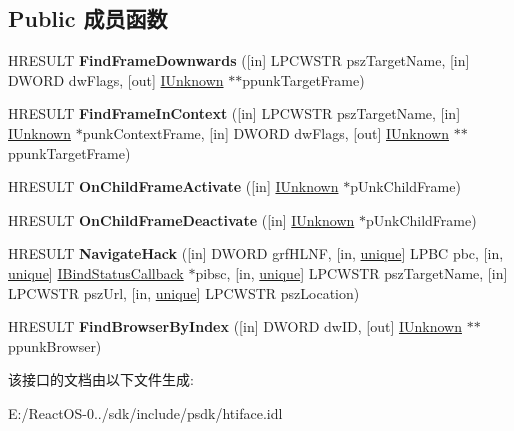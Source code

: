 \subsection*{Public 成员函数}
\begin{DoxyCompactItemize}
\item 
\mbox{\label{interface_i_target_frame_priv_a41ffeee3aa5cc4c9626868f0cfce2072}} 
H\+R\+E\+S\+U\+LT {\bfseries Find\+Frame\+Downwards} (\mbox{[}in\mbox{]} L\+P\+C\+W\+S\+TR psz\+Target\+Name, \mbox{[}in\mbox{]} D\+W\+O\+RD dw\+Flags, \mbox{[}out\mbox{]} \hyperlink{interface_i_unknown}{I\+Unknown} $\ast$$\ast$ppunk\+Target\+Frame)
\item 
\mbox{\label{interface_i_target_frame_priv_a149d03d477deeeffb41709668bf6246a}} 
H\+R\+E\+S\+U\+LT {\bfseries Find\+Frame\+In\+Context} (\mbox{[}in\mbox{]} L\+P\+C\+W\+S\+TR psz\+Target\+Name, \mbox{[}in\mbox{]} \hyperlink{interface_i_unknown}{I\+Unknown} $\ast$punk\+Context\+Frame, \mbox{[}in\mbox{]} D\+W\+O\+RD dw\+Flags, \mbox{[}out\mbox{]} \hyperlink{interface_i_unknown}{I\+Unknown} $\ast$$\ast$ppunk\+Target\+Frame)
\item 
\mbox{\label{interface_i_target_frame_priv_af96f999a3af04a8000cb3357f017fe14}} 
H\+R\+E\+S\+U\+LT {\bfseries On\+Child\+Frame\+Activate} (\mbox{[}in\mbox{]} \hyperlink{interface_i_unknown}{I\+Unknown} $\ast$p\+Unk\+Child\+Frame)
\item 
\mbox{\label{interface_i_target_frame_priv_a2c48ee3f13adf5eff484a99070088b00}} 
H\+R\+E\+S\+U\+LT {\bfseries On\+Child\+Frame\+Deactivate} (\mbox{[}in\mbox{]} \hyperlink{interface_i_unknown}{I\+Unknown} $\ast$p\+Unk\+Child\+Frame)
\item 
\mbox{\label{interface_i_target_frame_priv_abeb093e14cb457f5dbdbedca660285eb}} 
H\+R\+E\+S\+U\+LT {\bfseries Navigate\+Hack} (\mbox{[}in\mbox{]} D\+W\+O\+RD grf\+H\+L\+NF, \mbox{[}in, \hyperlink{interfaceunique}{unique}\mbox{]} L\+P\+BC pbc, \mbox{[}in, \hyperlink{interfaceunique}{unique}\mbox{]} \hyperlink{interface_i_bind_status_callback}{I\+Bind\+Status\+Callback} $\ast$pibsc, \mbox{[}in, \hyperlink{interfaceunique}{unique}\mbox{]} L\+P\+C\+W\+S\+TR psz\+Target\+Name, \mbox{[}in\mbox{]} L\+P\+C\+W\+S\+TR psz\+Url, \mbox{[}in, \hyperlink{interfaceunique}{unique}\mbox{]} L\+P\+C\+W\+S\+TR psz\+Location)
\item 
\mbox{\label{interface_i_target_frame_priv_ae42a7c57ad72cfe200a45495d9c8ede2}} 
H\+R\+E\+S\+U\+LT {\bfseries Find\+Browser\+By\+Index} (\mbox{[}in\mbox{]} D\+W\+O\+RD dw\+ID, \mbox{[}out\mbox{]} \hyperlink{interface_i_unknown}{I\+Unknown} $\ast$$\ast$ppunk\+Browser)
\end{DoxyCompactItemize}


该接口的文档由以下文件生成\+:\begin{DoxyCompactItemize}
\item 
E\+:/\+React\+O\+S-\/0../sdk/include/psdk/htiface.\+idl\end{DoxyCompactItemize}
